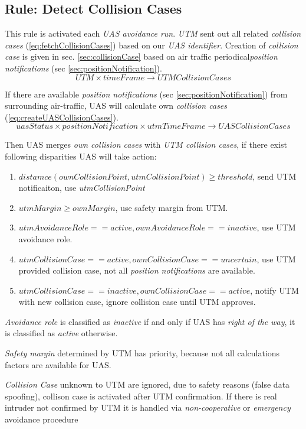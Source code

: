 \subsection{Rule: Detect Collision Cases}\label{sec:detectCollisionCases}
\noindent This rule is activated each \emph{UAS avoidance run}. \emph{UTM} sent out all related \emph{collision cases} (\ref{eq:fetchCollisionCases}) based on our \emph{UAS identifier}. Creation of \emph{collision case} is given in sec. \ref{sec:collisionCase} based on air traffic periodical\emph{position notifications} (sec \ref{sec:positionNotification}).
\begin{equation}\label{eq:fetchCollisionCases}
    UTM\times timeFrame \to UTMCollisionCases
\end{equation}

If there are available \emph{position notifications} (sec \ref{sec:positionNotification}) from surrounding air-traffic, UAS will calculate own \emph{collision cases} (\ref{eq:createUASCollisionCases}).
\begin{equation}\label{eq:createUASCollisionCases}
    uasStatus\times positionNotification\times utmTimeFrame\to UASCollisionCases
\end{equation}

Then UAS merges \emph{own collision cases} with \emph{UTM collision cases}, if there exist following disparities UAS will take action:
\begin{enumerate}
    \item $distamce(ownCollisionPoint,utmCollisionPoint)\ge threshold$, send UTM notificaiton, use \emph{utmCollisionPoint}
    \item $utmMargin \ge ownMargin$, use safety margin from UTM.
    \item $utmAvoidanceRole == active, ownAvoidanceRole == inactive$, use UTM avoidance role.
    \item $utmCollisionCase == active, ownCollisionCase == uncertain$, use UTM provided collision case, not all \emph{position notifications} are available. 
    \item $utmCollisionCase == inactive, ownCollisionCase == active$, notify UTM with new collision case, ignore collision case until UTM approves.
\end{enumerate}
\begin{note}
    \emph{Avoidance role} is classified as \emph{inactive} if and only if UAS has \emph{right of the way}, it is classified as \emph{active} otherwise.
    
    \emph{Safety margin} determined by UTM has priority, because not all calculations factors are available for UAS.
    
    \emph{Collision Case} unknown to UTM are ignored, due to safety reasons (false data spoofing), collison case is activated after UTM confirmation. If there is real intruder not confirmed by UTM it is handled via \emph{non-cooperative} or \emph{emergency} avoidance procedure
\end{note}

